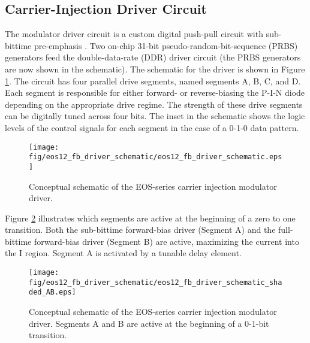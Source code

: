 
\subsection{Carrier-Injection Driver Circuit}

	The modulator driver circuit is a custom digital push-pull circuit with sub-bittime pre-emphasis \cite{moss_isscc13}.  Two on-chip 31-bit pseudo-random-bit-sequence (PRBS) generators feed the double-data-rate (DDR) driver circuit (the PRBS generators are now shown in the schematic).   The schematic for the driver is shown in Figure \ref{fig:eos12_fb_driver_schematic}.  The circuit has four parallel drive segments, named segments A, B, C, and D.  Each segment is responsible for either forward- or reverse-biasing the P-I-N diode depending on the appropriate drive regime.  The strength of these drive segments can be digitally tuned across four bits.  The inset in the schematic shows the logic levels of the control signals for each segment in the case of a 0-1-0 data pattern.

	\begin{figure}[H]
		\begin{center}
			\texttt{[image: fig/eos12\_fb\_driver\_schematic/eos12\_fb\_driver\_schematic.eps]}
			\caption{\label{fig:eos12_fb_driver_schematic}Conceptual schematic of the EOS-series carrier injection modulator driver.}
		\end{center}
	\end{figure}


Figure \ref{fig:eos12_fb_driver_schematic_shaded_AB} illustrates which segments are active at the beginning of a zero to one transition. Both the sub-bittime forward-bias driver (Segment A) and the full-bittime forward-bias driver (Segment B) are active, maximizing the current into the I region.  Segment A is activated by a tunable delay element.

	\begin{figure}[H]
		\begin{center}
			\texttt{[image: fig/eos12\_fb\_driver\_schematic/eos12\_fb\_driver\_schematic\_shaded\_AB.eps]}
			\caption{\label{fig:eos12_fb_driver_schematic_shaded_AB}Conceptual schematic of the EOS-series carrier injection modulator driver. Segments A and B are active at the beginning of a 0-1-bit transition.}
		\end{center}
	\end{figure}

